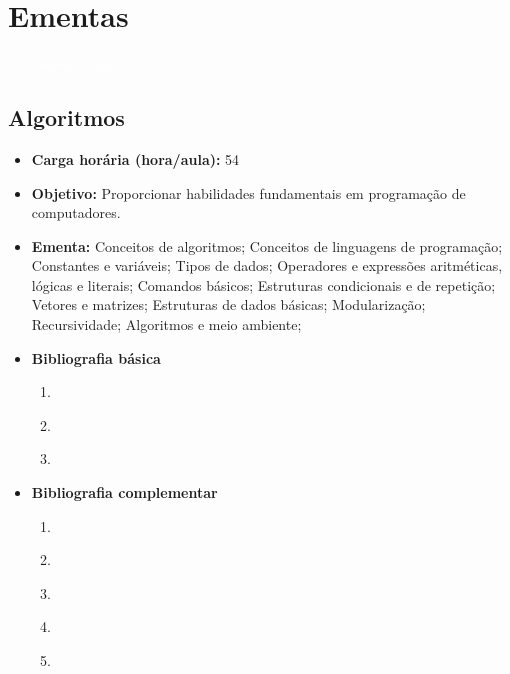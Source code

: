 \documentclass[11pt,fleqn]{book} %
\begin{document}
\chapter{Ementas}\label{ementas}
\vspace{6em}
\begin{flushright}
	\textit{\textcolor{white}{Um bonita citação...}}
\end{flushright}
\vspace{6em}



\newpage
\section{Algoritmos}\label{1_algoritmos}
\begin{itemize}
	\item \textbf{Carga horária (hora/aula):} 54
	\item \textbf{Objetivo:} Proporcionar habilidades fundamentais em programação de computadores.
	\item \textbf{Ementa:} 
	Conceitos de algoritmos;
	Conceitos de linguagens de programação;
	Constantes e variáveis;
	Tipos de dados;
	Operadores e expressões aritméticas, lógicas e literais; 
	Comandos básicos;
	Estruturas condicionais e de repetição;
	Vetores e matrizes;
	Estruturas de dados básicas;
	Modularização;
	Recursividade;
	Algoritmos e meio ambiente;
	\item \textbf{Bibliografia básica}
	\begin{enumerate}
		\item \cite{cormen2002algoritmos}
		\item \cite{manzano2010algoritmos}
		\item \cite{lafore2004estruturas}
		
	\end{enumerate}
	\item \textbf{Bibliografia complementar}
	\begin{enumerate}
		\item \cite{ascencio2010estruturas}
		\item \cite{szwarcfiter1994estruturas}
		\item \cite{silva2007estrutura}
		\item \cite{toscani_2012}
		\item \cite{farrer1999algoritmos}
	\end{enumerate}	
\end{itemize}
\end{document}
